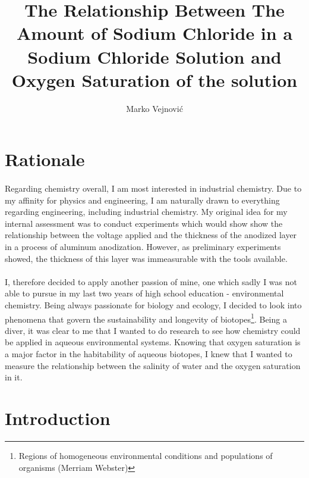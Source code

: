 \documentclass[a4paper]{article}
\begin{document}
\title{The Relationship Between The Amount of Sodium Chloride in a Sodium
Chloride Solution and Oxygen Saturation of the solution}
\author{Marko Vejnovi\'{c}}

\maketitle

\doublespacing

\section*{Rationale}

\paragraph*{}
Regarding chemistry overall, I am most interested in industrial chemistry. Due
to my affinity for physics and engineering, I am naturally drawn to everything
regarding engineering, including industrial chemistry. My original idea for my
internal assessment was to conduct experiments which would show show the
relationship between the voltage applied and the thickness of the anodized
layer in a process of aluminum anodization. However, as preliminary
experiments showed, the thickness of this layer was immeasurable with the tools
available.

\paragraph*{}
I, therefore decided to apply another passion of mine, one which sadly I was
not able to pursue in my last two years of high school education -
environmental chemistry. Being always passionate for biology and ecology, I
decided to look into phenomena that govern the sustainability and longevity of
biotopes\footnote{Regions of homogeneous environmental conditions and
populations of organisms (Merriam Webster)}. Being a diver, it was clear to me
that I wanted to do research to see how chemistry could be applied in aqueous
environmental systems. Knowing that oxygen saturation is a major factor in the
habitability of aqueous biotopes, I knew that I wanted to measure the
relationship between the salinity of water and the oxygen saturation in it.

\section{Introduction}
\end{document}

